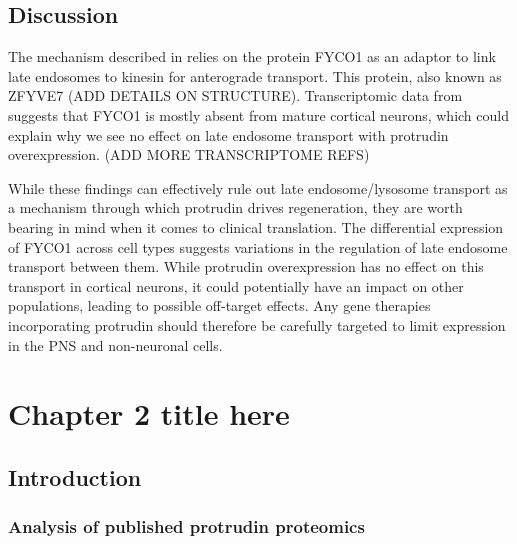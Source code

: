 \documentclass[
]{book}
\begin{document}
\hypertarget{discussion}{%
\section{Discussion}\label{discussion}}

The mechanism described in \citep{raiborgRepeatedEREndosome2015} relies on the protein FYCO1 as an adaptor to link late endosomes to kinesin for anterograde transport. This protein, also known as ZFYVE7 (ADD DETAILS ON STRUCTURE). Transcriptomic data from \citep{kosekiSelectiveRab11Transport2017} suggests that FYCO1 is mostly absent from mature cortical neurons, which could explain why we see no effect on late endosome transport with protrudin overexpression. (ADD MORE TRANSCRIPTOME REFS)

While these findings can effectively rule out late endosome/lysosome transport as a mechanism through which protrudin drives regeneration, they are worth bearing in mind when it comes to clinical translation. The differential expression of FYCO1 across cell types suggests variations in the regulation of late endosome transport between them. While protrudin overexpression has no effect on this transport in cortical neurons, it could potentially have an impact on other populations, leading to possible off-target effects. Any gene therapies incorporating protrudin should therefore be carefully targeted to limit expression in the PNS and non-neuronal cells.

\hypertarget{chapter-2-title-here}{%
\chapter{Chapter 2 title here}\label{chapter-2-title-here}}

\hypertarget{introduction-1}{%
\section{Introduction}\label{introduction-1}}

\lipsum

\hypertarget{analysis-of-published-protrudin-proteomics}{%
\subsection{Analysis of published protrudin proteomics}\label{analysis-of-published-protrudin-proteomics}}
\end{document}
